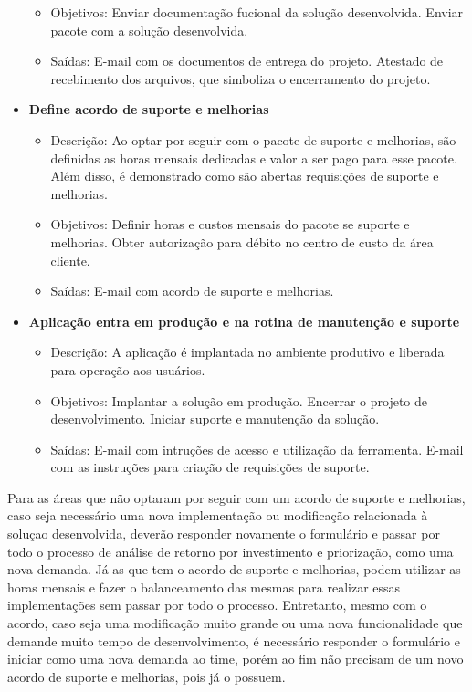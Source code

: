 \begin{itemize}
\begin{itemize}
			\item Objetivos: Enviar documentação fucional da solução desenvolvida. Enviar pacote com a solução desenvolvida.
			\item Saídas: E-mail com os documentos de entrega do projeto. Atestado de recebimento dos arquivos, que simboliza o encerramento do projeto.
		\end{itemize}
		\item \textbf{Define acordo de suporte e melhorias}
		\begin{itemize}
			\item Descrição: Ao optar por seguir com o pacote de suporte e melhorias, são definidas as horas mensais dedicadas e valor a ser pago para esse pacote. Além disso, é demonstrado como são abertas requisições de suporte e melhorias.
			\item Objetivos: Definir horas e custos mensais do pacote se suporte e melhorias. Obter autorização para débito no centro de custo da área cliente.
			\item Saídas: E-mail com acordo de suporte e melhorias.
		\end{itemize}
		\item \textbf{Aplicação entra em produção e na rotina de manutenção e suporte}
		\begin{itemize}
			\item Descrição: A aplicação é implantada no ambiente produtivo e liberada para operação aos usuários.
			\item Objetivos: Implantar a solução em produção. Encerrar o projeto de desenvolvimento. Iniciar suporte e manutenção da solução.
			\item Saídas: E-mail com intruções de acesso e utilização da ferramenta. E-mail com as instruções para criação de requisições de suporte.
		\end{itemize}
	\end{itemize}

	Para as áreas que não optaram por seguir com um acordo de suporte e melhorias, caso seja necessário uma nova implementação ou modificação relacionada à soluçao desenvolvida, deverão responder novamente o formulário e passar por todo o processo de análise de retorno por investimento e priorização, como uma nova demanda.
	Já as que tem o acordo de suporte e melhorias, podem utilizar as horas mensais e fazer o balanceamento das mesmas para realizar essas implementações sem passar por todo o processo. Entretanto, mesmo com o acordo, caso seja uma modificação muito grande ou uma nova funcionalidade que demande muito tempo de desenvolvimento, é necessário responder o formulário e iniciar como uma nova demanda ao time, porém ao fim não precisam de um novo acordo de suporte e melhorias, pois já o possuem.

